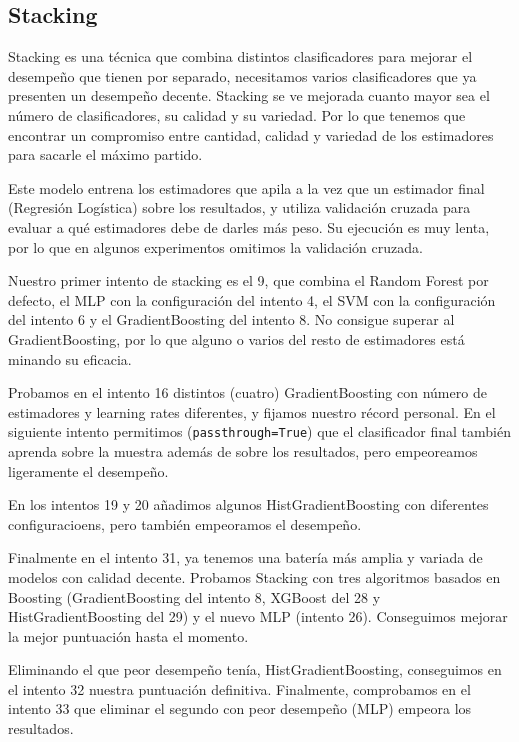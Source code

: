 \documentclass{article}
\begin{document}
\subsection{Stacking}

Stacking es una técnica que combina distintos clasificadores para
mejorar el desempeño que tienen por separado, necesitamos varios
clasificadores que ya presenten un desempeño decente. Stacking se ve
mejorada cuanto mayor sea el número de clasificadores, su calidad y su
variedad. Por lo que tenemos que encontrar un compromiso entre
cantidad, calidad y variedad de los estimadores para sacarle el máximo
partido.

Este modelo entrena los estimadores que apila a la vez que un
estimador final (Regresión Logística) sobre los resultados, y utiliza
validación cruzada para evaluar a qué estimadores debe de darles más
peso. Su ejecución es muy lenta, por lo que en algunos experimentos
omitimos la validación cruzada.

Nuestro primer intento de stacking es el 9, que combina el Random
Forest por defecto, el MLP con la configuración del intento 4, el SVM
con la configuración del intento 6 y el GradientBoosting del intento
8. No consigue superar al GradientBoosting, por lo que alguno o varios
del resto de estimadores está minando su eficacia.

Probamos en el intento 16 distintos (cuatro) GradientBoosting con
número de estimadores y learning rates diferentes, y fijamos nuestro
récord personal. En el siguiente intento permitimos
(\texttt{passthrough=True}) que el clasificador final también aprenda
sobre la muestra además de sobre los resultados, pero empeoreamos
ligeramente el desempeño.

En los intentos 19 y 20 añadimos algunos HistGradientBoosting con
diferentes configuracioens, pero también empeoramos el desempeño.

Finalmente en el intento 31, ya tenemos una batería más amplia y
variada de modelos con calidad decente. Probamos Stacking con tres
algoritmos basados en Boosting (GradientBoosting del intento 8,
XGBoost del 28 y HistGradientBoosting del 29) y el nuevo MLP (intento
26). Conseguimos mejorar la mejor puntuación hasta el momento.

Eliminando el que peor desempeño tenía, HistGradientBoosting,
conseguimos en el intento 32 nuestra puntuación definitiva. Finalmente,
comprobamos en el intento 33 que eliminar el segundo con peor
desempeño (MLP) empeora los resultados.

\pagebreak
\end{document}
